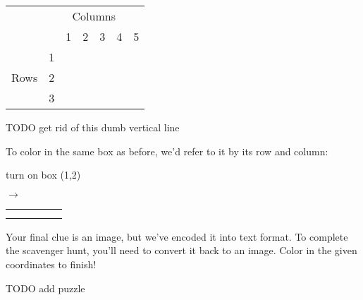 \documentclass{article}
\begin{document}
\begin{center}
\begin{tabular}{*{7}{c|}}
\multicolumn{1}{c}{} & \multicolumn{6}{c}{Columns} \\ 
\multicolumn{2}{c}{} & \multicolumn{1}{c}{1} & \multicolumn{1}{c}{2} & \multicolumn{1}{c}{3} & \multicolumn{1}{c}{4} & \multicolumn{1}{c}{5} 
\\ \cline{3-7}
\multirow{3}{*}{Rows} & 1 & & & & & \\ \cline{3-7}
                      & 2 & & & & & \\ \cline{3-7}
                      & 3 & & & & & \\ \cline{3-7}
\end{tabular}
\end{center}

TODO get rid of this dumb vertical line

To color in the same box as before, we'd refer to it by its row and column: 

\begin{minipage}[c]{.4\linewidth}
\center
turn on box (1,2) 
\end{minipage}
\begin{minipage}[c]{.2\linewidth} $\rightarrow$ \end{minipage}
\begin{minipage}[c]{.4\linewidth}
\center
\begin{tabular}{*{5}{|c}|}
\hline
 &  & & & \\ \hline
 & & & & \\ \hline
 & & & & \\ \hline
\end{tabular}
\end{minipage}

Your final clue is an image, but we've encoded it into text format. To complete the scavenger hunt, you'll need to convert it back to an image. Color in the given coordinates to finish!

TODO add puzzle
\end{document}
